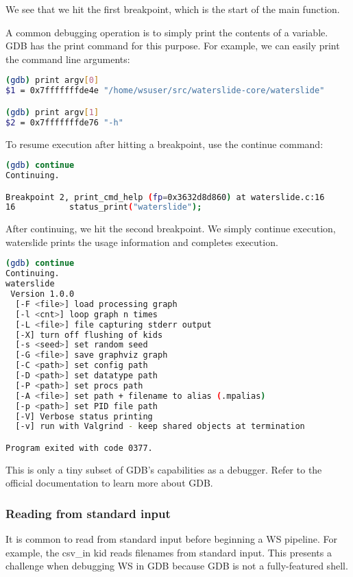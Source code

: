 \documentclass[11pt]{article}
\begin{document}
We see that we hit the first breakpoint, which is the start of the main
function.

A common debugging operation is to simply print the contents of a variable. 
GDB has the print command for this purpose. For example, we can easily print
the command line arguments: 

\begin{lstlisting}[language=bash]
(gdb) print argv[0]
$1 = 0x7fffffffde4e "/home/wsuser/src/waterslide-core/waterslide"

(gdb) print argv[1]
$2 = 0x7fffffffde76 "-h"
\end{lstlisting}

To resume execution after hitting a breakpoint, use the continue command: 

\begin{lstlisting}[language=bash]
(gdb) continue
Continuing.

Breakpoint 2, print_cmd_help (fp=0x3632d8d860) at waterslide.c:16
16           status_print("waterslide");
\end{lstlisting}

After continuing, we hit the second breakpoint. We simply continue execution, 
waterslide prints the usage information and completes execution. 

\begin{lstlisting}[language=bash]
(gdb) continue
Continuing.
waterslide
 Version 1.0.0
  [-F <file>] load processing graph
  [-l <cnt>] loop graph n times
  [-L <file>] file capturing stderr output
  [-X] turn off flushing of kids
  [-s <seed>] set random seed
  [-G <file>] save graphviz graph
  [-C <path>] set config path
  [-D <path>] set datatype path
  [-P <path>] set procs path
  [-A <file>] set path + filename to alias (.mpalias)
  [-p <path>] set PID file path
  [-V] Verbose status printing
  [-v] run with Valgrind - keep shared objects at termination

Program exited with code 0377.
\end{lstlisting}

This is only a tiny subset of GDB's capabilities as a debugger. Refer to the
official documentation to learn more about GDB. 


\subsubsection{Reading from standard input}

It is common to read from standard input before beginning a WS pipeline. For
example, the csv\_in kid reads filenames from standard input. This
presents a challenge when debugging WS in GDB because GDB is not a
fully-featured shell.
\end{document}
